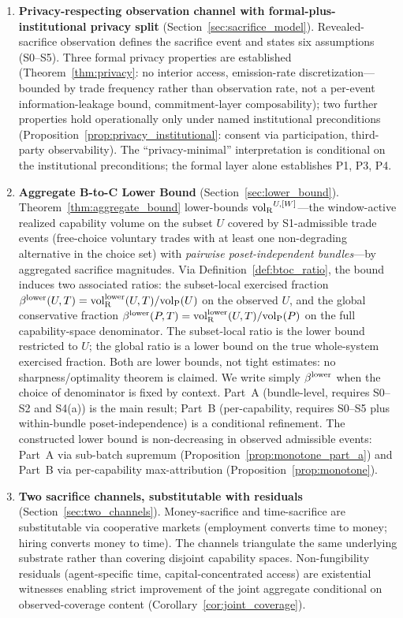 \begin{enumerate}
\item \textbf{Privacy-respecting observation channel with
  formal-plus-institutional privacy split}
  (Section~\ref{sec:sacrifice_model}).
  Revealed-sacrifice observation defines the sacrifice event and
  states six assumptions (S0--S5).  Three formal privacy
  properties are established (Theorem~\ref{thm:privacy}: no
  interior access, emission-rate discretization---bounded by
  trade frequency rather than observation rate, not a
  per-event information-leakage bound, commitment-layer
  composability); two further properties hold operationally
  only
  under named institutional preconditions
  (Proposition~\ref{prop:privacy_institutional}: consent via
  participation, third-party observability).  The
  ``privacy-minimal'' interpretation is conditional on the
  institutional preconditions; the formal layer alone establishes
  P1, P3, P4.

\item \textbf{Aggregate B-to-C Lower Bound}
  (Section~\ref{sec:lower_bound}).
  Theorem~\ref{thm:aggregate_bound} lower-bounds
  ${\operatorname{vol}_{\mathrm{R}}}^{U,[W]}$---the window-active realized capability
  volume on the subset $U$ covered by S1-admissible trade
  events (free-choice voluntary trades with at least one
  non-degrading alternative in the choice set) with
  \emph{pairwise poset-independent bundles}---by aggregated
  sacrifice magnitudes.  Via
  Definition~\ref{def:btoc_ratio}, the bound induces two
  associated ratios: the subset-local exercised fraction
  $\beta^{\mathrm{lower}}(U, T) = {\operatorname{vol}_{\mathrm{R}}^{\mathrm{lower}}}(U, T) / {\operatorname{vol}_{\mathrm{P}}}(U)$ on the observed
  $U$, and the global conservative fraction $\beta^{\mathrm{lower}}(P, T) =
  {\operatorname{vol}_{\mathrm{R}}^{\mathrm{lower}}}(U, T) / {\operatorname{vol}_{\mathrm{P}}}(P)$ on the full capability-space
  denominator.  The subset-local ratio is the lower bound
  restricted to $U$; the global ratio is a lower bound on the
  true whole-system exercised fraction.  Both are lower bounds,
  not tight estimates: no sharpness/optimality theorem is
  claimed.  We write simply $\beta^{\mathrm{lower}}$ when the choice of
  denominator is fixed by context.  Part~A
  (bundle-level, requires S0--S2 and S4(a)) is the main result;
  Part~B (per-capability, requires S0--S5 plus within-bundle
  poset-independence) is a conditional refinement.  The
  constructed lower bound is non-decreasing in observed
  admissible events: Part~A via sub-batch supremum
  (Proposition~\ref{prop:monotone_part_a}) and Part~B via
  per-capability max-attribution
  (Proposition~\ref{prop:monotone}).

\item \textbf{Two sacrifice channels, substitutable with
  residuals}
  (Section~\ref{sec:two_channels}).
  Money-sacrifice and time-sacrifice are substitutable via
  cooperative markets (employment converts time to money;
  hiring converts money to time).  The channels triangulate the
  same underlying substrate rather than covering disjoint
  capability spaces.  Non-fungibility residuals
  (agent-specific time, capital-concentrated access) are
  existential witnesses enabling strict improvement of the
  joint aggregate conditional on observed-coverage content
  (Corollary~\ref{cor:joint_coverage}).


\end{enumerate}
